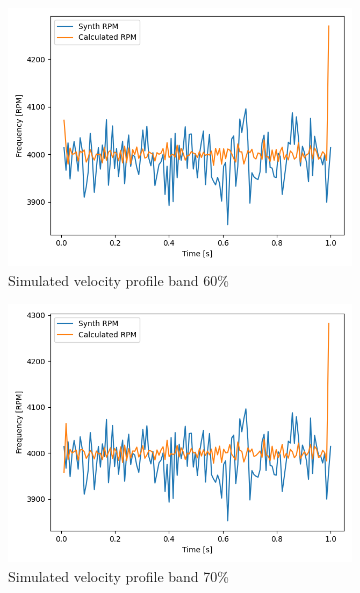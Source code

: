 \documentclass[10pt,fleqn,a4paper,twoside]{article}
\begin{document}
\begin{figure}[H]
    \begin{subfigure}{0.4\textwidth}
        \includegraphics[width=\textwidth]{Figures/rpm_analysis_band_60.png}
        \caption{Simulated velocity profile band 60\%}
        \label{fig:fourth}
    \end{subfigure}
    \centering
    \hfill
    \begin{subfigure}{0.4\textwidth}
        \includegraphics[width=\textwidth]{Figures/rpm_analysis_band_70.png}
        \caption{Simulated velocity profile band 70\%}
        \label{fig:fifth}
    \end{subfigure}
    \centering
    \hfill
    \begin{subfigure}{0.4\textwidth}

\end{subfigure}
\end{figure}
\end{document}
